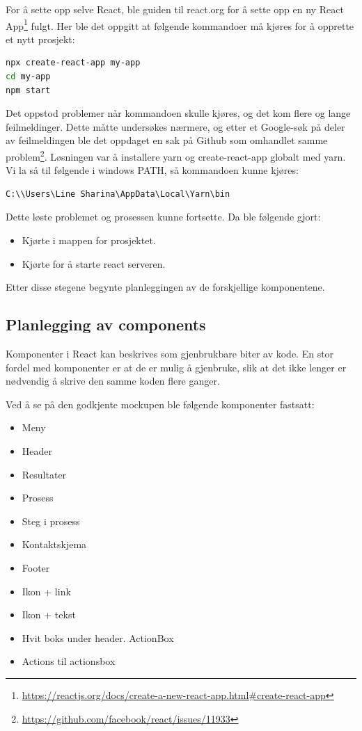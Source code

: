 For å sette opp selve React, ble  guiden til react.org for å sette opp en ny React App\footnote{\url{https://reactjs.org/docs/create-a-new-react-app.html\#create-react-app}} fulgt. Her ble det oppgitt at følgende kommandoer må kjøres for å opprette et nytt prosjekt:
\begin{lstlisting}[caption={Oppretting av React App},language=bash]
npx create-react-app my-app
cd my-app
npm start
\end{lstlisting}

Det oppstod problemer når kommandoen  skulle kjøres, og det kom flere og lange feilmeldinger. Dette måtte undersøkes nærmere, og etter et Google-søk på deler av feilmeldingen ble det oppdaget en sak på Github som omhandlet samme problem\footnote{\url{https://github.com/facebook/react/issues/11933}}.
Løsningen var å installere yarn og create-react-app globalt med yarn. Vi la så til følgende i windows PATH, så kommandoen kunne kjøres:
\begin{lstlisting}
C:\\Users\Line Sharina\AppData\Local\Yarn\bin
\end{lstlisting}
Dette løste problemet og prosessen kunne fortsette. Da ble følgende gjort:

\begin{itemize}
    \item Kjørte  i mappen for prosjektet.
    \item Kjørte  for å starte react serveren.
\end{itemize}

Etter disse stegene begynte planleggingen av de forskjellige komponentene.

\subsection{Planlegging av components}
Komponenter i React kan beskrives som gjenbrukbare biter av kode. En stor fordel med komponenter er at de er mulig å gjenbruke, slik at det ikke lenger er nødvendig å skrive den samme koden flere ganger. 

Ved å se på den godkjente mockupen ble følgende komponenter fastsatt: 
\begin{itemize}
    \item Meny
    \item Header
    \item Resultater
    \item Prosess
    \item Steg i prosess
    \item Kontaktskjema
    \item Footer
    \item Ikon + link
    \item Ikon + tekst
    \item Hvit boks under header. ActionBox
    \item Actions til actionsbox
\end{itemize}

